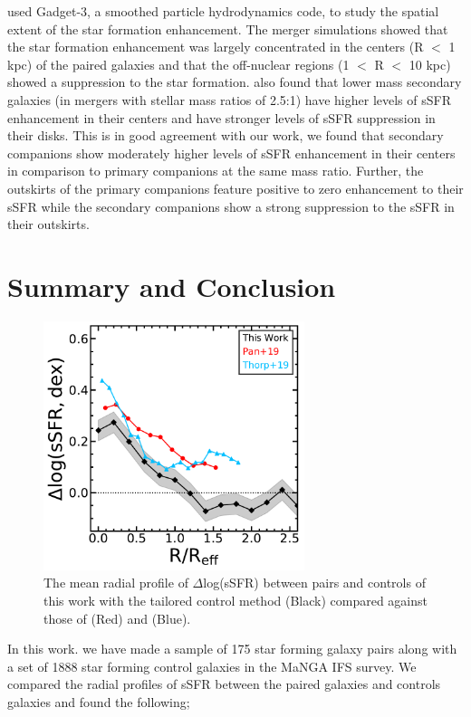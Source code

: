 \documentclass[iop,revtex4,twocolumn,apj,numberedappendix,appendixfloats]{emulateapj}
\begin{document}
\citet{Moreno:2015} used {\sc Gadget}-3, a smoothed particle hydrodynamics code, to study the spatial extent of the star formation enhancement. The merger simulations showed that the star formation enhancement was largely concentrated in the centers (R $<$ 1 kpc) of the paired galaxies and that the off-nuclear regions (1 $<$ R $<$ 10 kpc) showed a suppression to the star formation. \citet{Moreno:2015} also found that lower mass secondary galaxies (in mergers with stellar mass ratios of 2.5:1) have higher levels of sSFR enhancement in their centers and have stronger levels of sSFR suppression in their disks. This is in good agreement with our work, we found that secondary companions show moderately higher levels of sSFR enhancement in their centers in comparison to primary companions at the same mass ratio. Further, the outskirts of the primary companions feature positive to zero enhancement to their sSFR while the secondary companions show a strong suppression to the sSFR in their outskirts. 

\section{Summary and Conclusion}\label{sec:sum}

\begin{figure}
\centering
\includegraphics[width=3in]{fig/prof_comp.pdf}
\caption[]{The mean radial profile of $\Delta$log(sSFR) between pairs and controls of this work with the tailored control method (Black) compared against those of \citet{Pan:2019} (Red) and \citet{Thorp:2019} (Blue).}
\label{fig:prof_comp}
\end{figure}

In this work. we have made a sample of 175 star forming galaxy pairs along with a set of 1888 star forming control galaxies in the MaNGA IFS survey. We compared the radial profiles of sSFR between the paired galaxies and controls galaxies and found the following;
\end{document}
